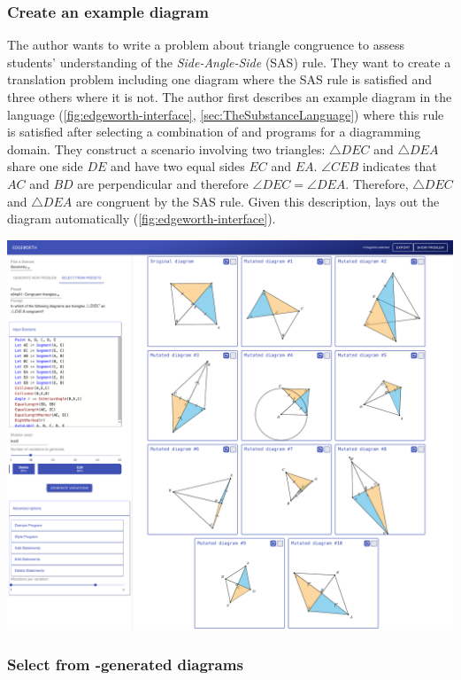 \subsubsection{Create an example diagram} 
\label{sec:create-scenario}

The author wants to write a problem about triangle congruence to assess students' understanding of the \textit{Side-Angle-Side} (SAS) rule. They want to create a translation problem including one diagram where the SAS rule is satisfied and three others where it is not. The author first describes an example diagram in the \Substance language (\cref{fig:edgeworth-interface}, \cref{sec:TheSubstanceLanguage}) where this rule is satisfied after selecting a combination of \Style and \Domain programs for a diagramming domain. They construct a scenario involving two triangles: $\triangle DEC$ and $\triangle DEA$ share one side $DE$ and have two equal sides $EC$ and $EA$. $\angle CEB$ indicates that $AC$ and $BD$ are perpendicular and therefore $\angle DEC = \angle DEA$. Therefore, $\triangle DEC$ and $\triangle DEA$ are congruent by the SAS rule. Given this description, \Edgeworth lays out the diagram automatically (\cref{fig:edgeworth-interface}). 

\begin{center}
\includegraphics[width=0.3\linewidth]{assets/edgeworth/edgeworth-ui-correct.pdf}
\end{center}



\subsubsection{Select from \Edgeworth-generated diagrams}
\label{sec:select-diagrams}

